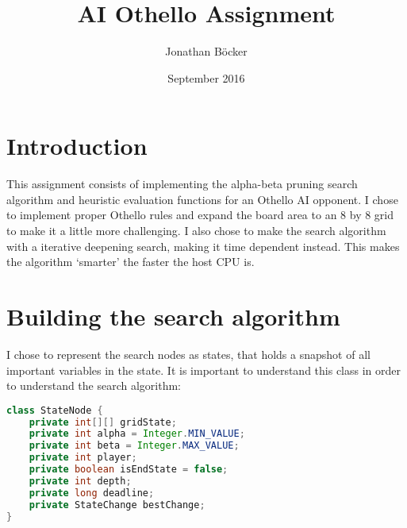 \documentclass{article}
\title{AI Othello Assignment}
\author{Jonathan Böcker}
\date{September 2016}
\begin{document}
\maketitle

\section{Introduction}
This assignment consists of implementing the alpha-beta pruning search algorithm
and heuristic evaluation functions for an Othello AI opponent. I chose to implement
proper Othello rules and expand the board area to an 8 by 8 grid to make it a little
more challenging. I also chose to make the search algorithm with a iterative deepening search,
making it time dependent instead.
This makes the algorithm `smarter' the faster the host CPU is.

\section{Building the search algorithm}
I chose to represent the search nodes as states, that holds a snapshot of all important
variables in the state. It is important to understand this class in order to understand
the search algorithm:

\begin{lstlisting}[language=Java]
class StateNode {
    private int[][] gridState;
    private int alpha = Integer.MIN_VALUE;
    private int beta = Integer.MAX_VALUE;
    private int player;
    private boolean isEndState = false;
    private int depth;
    private long deadline;
    private StateChange bestChange;
}
\end{lstlisting}
\end{document}
